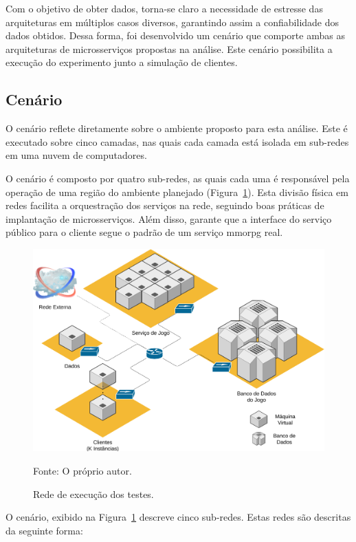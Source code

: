 Com o objetivo de obter dados, torna-se claro a necessidade de estresse das arquiteturas em múltiplos casos diversos, garantindo assim a confiabilidade dos dados obtidos.
%
Dessa forma, foi desenvolvido um cenário que comporte ambas as arquiteturas de microsserviços propostas na análise.
%
Este cenário possibilita a execução do experimento junto a simulação de clientes.



\subsection{Cenário}



O cenário reflete diretamente sobre o ambiente proposto para esta análise.
%
Este é executado sobre cinco camadas, nas quais cada camada está isolada em sub-redes em uma nuvem de computadores.

O cenário é composto por quatro sub-redes, as quais cada uma é responsável pela operação de uma região do ambiente planejado (Figura~\ref{fig:cenario}).
%
Esta divisão física em redes facilita a orquestração dos serviços na rede, seguindo boas práticas de implantação de microsserviços.
%
Além disso, garante que a interface do serviço público para o cliente segue o padrão de um serviço \ac{mmorpg} real.

  \vspace{-0.3cm}
\begin{figure}[htb!]
  \caption{Rede de execução dos testes.}
    \vspace{-0.3cm}
  \label{fig:cenario}
  \includegraphics[width=.8\textwidth]{img/cap3/cenario.png}
  \centering

  Fonte: O próprio autor.
\end{figure}

O cenário, exibido na Figura~\ref{fig:cenario} descreve cinco sub-redes.
%
Estas redes são descritas da seguinte forma:


